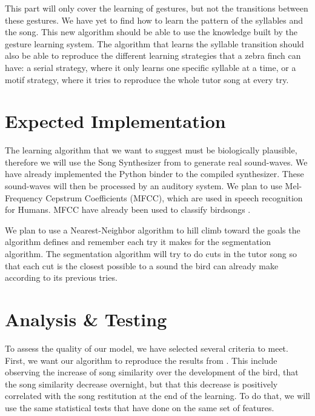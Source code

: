 \documentclass[a4paper]{article}
\begin{document}
This part will only cover the learning of gestures, but not the transitions
between these gestures. We have yet to find how to learn the pattern of the
syllables and the song. This new algorithm should be able to use the knowledge
built by the gesture learning system. The algorithm that learns the syllable
transition should also be able to reproduce the different learning strategies
that a zebra finch can have: a serial strategy, where it only learns one
specific syllable at a time, or a motif strategy, where it tries to reproduce
the whole tutor song at every try.


\section*{Expected Implementation}

The learning algorithm that we want to suggest must be biologically plausible,
therefore we will use the Song Synthesizer from \textcite{boari_automatic_2015}
to generate real sound-waves. We have already implemented the Python binder to
the compiled synthesizer. These sound-waves will then be processed by an
auditory system. We plan to use Mel-Frequency Cepstrum Coefficients
(MFCC), which are used in speech recognition for Humans.
MFCC have already been used to classify birdsongs \parencite{chou_studies_2008}.

We plan to use a Nearest-Neighbor algorithm to hill climb toward the goals the
algorithm defines and remember each try it makes for the segmentation algorithm.
The segmentation algorithm will try to do cuts in the tutor song so that each
cut is the closest possible to a sound the bird can already make according to
its previous tries.

\section*{Analysis \& Testing}

To assess the quality of our model, we have selected several criteria to meet.
First, we want our algorithm to reproduce the results from
\textcite{deregnaucourt_how_2005}. This include observing the increase of song
similarity \parencite{tchernichovski_procedure_2000} over the development of the
bird, that the song similarity decrease overnight, but that this decrease is
positively correlated with the song restitution at the end of the learning. To
do that, we will use the same statistical tests that
\textcite{deregnaucourt_how_2005} have done on the same set of features.
\end{document}
